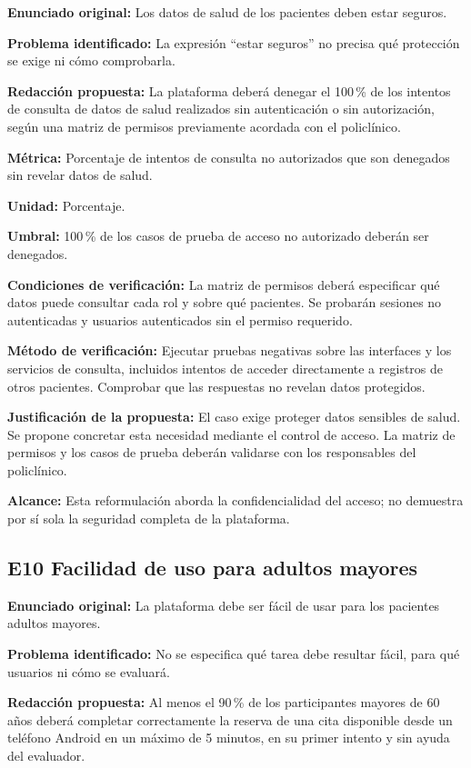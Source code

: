 \documentclass[11pt,a4paper]{article}
\begin{document}
\textbf{Enunciado original:}
Los datos de salud de los pacientes deben
estar seguros.

\textbf{Problema identificado:}
La expresión ``estar seguros'' no precisa
qué protección se exige ni cómo comprobarla.

\textbf{Redacción propuesta:}
La plataforma deberá denegar el 100\,\% de
los intentos de consulta de datos de salud
realizados sin autenticación o sin autorización,
según una matriz de permisos previamente
acordada con el policlínico.

\textbf{Métrica:}
Porcentaje de intentos de consulta no autorizados
que son denegados sin revelar datos de salud.

\textbf{Unidad:} Porcentaje.

\textbf{Umbral:}
100\,\% de los casos de prueba de acceso
no autorizado deberán ser denegados.

\textbf{Condiciones de verificación:}
La matriz de permisos deberá especificar
qué datos puede consultar cada rol y sobre
qué pacientes. Se probarán sesiones no
autenticadas y usuarios autenticados sin
el permiso requerido.

\textbf{Método de verificación:}
Ejecutar pruebas negativas sobre las interfaces
y los servicios de consulta, incluidos intentos
de acceder directamente a registros de otros
pacientes. Comprobar que las respuestas
no revelan datos protegidos.

\textbf{Justificación de la propuesta:}
El caso exige proteger datos sensibles de salud.
Se propone concretar esta necesidad mediante
el control de acceso. La matriz de permisos
y los casos de prueba deberán validarse
con los responsables del policlínico.

\textbf{Alcance:}
Esta reformulación aborda la confidencialidad
del acceso; no demuestra por sí sola
la seguridad completa de la plataforma.

\subsection{E10 Facilidad de uso para adultos mayores}

\textbf{Enunciado original:}
La plataforma debe ser fácil de usar para
los pacientes adultos mayores.

\textbf{Problema identificado:}
No se especifica qué tarea debe resultar fácil,
para qué usuarios ni cómo se evaluará.

\textbf{Redacción propuesta:}
Al menos el 90\,\% de los participantes mayores
de 60 años deberá completar correctamente
la reserva de una cita disponible desde un
teléfono Android en un máximo de 5 minutos,
en su primer intento y sin ayuda del evaluador.
\end{document}

